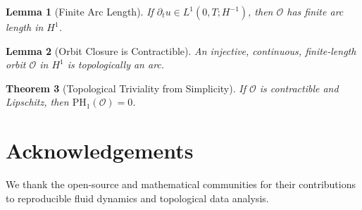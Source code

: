 \documentclass[11pt]{article}
\newtheorem{theorem}{Theorem}[section]
\newtheorem{lemma}[theorem]{Lemma}
\theoremstyle{definition}
\begin{document}
\begin{lemma}[Finite Arc Length]
If $\partial_t u \in L^1(0, T; H^{-1})$, then $\mathcal{O}$ has finite arc length in $H^1$.
\end{lemma}

\begin{lemma}[Orbit Closure is Contractible]
An injective, continuous, finite-length orbit $\mathcal{O}$ in $H^1$ is topologically an arc.
\end{lemma}

\begin{theorem}[Topological Triviality from Simplicity]
If $\mathcal{O}$ is contractible and Lipschitz, then $\mathrm{PH}_1(\mathcal{O}) = 0$.
\end{theorem}


\section*{Acknowledgements}
We thank the open-source and mathematical communities for their contributions to reproducible fluid dynamics and topological data analysis.
\end{document}
